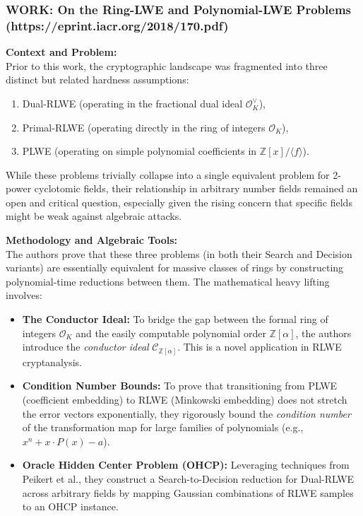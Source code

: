 \subsubsection{WORK: On the Ring-LWE and Polynomial-LWE Problems (https://eprint.iacr.org/2018/170.pdf)}

\textbf{Context and Problem:} \\
Prior to this work, the cryptographic landscape was fragmented into three distinct but related hardness assumptions: 
\begin{enumerate}
    \item Dual-RLWE (operating in the fractional dual ideal $\mathcal{O}_K^\vee$),
    \item Primal-RLWE (operating directly in the ring of integers $\mathcal{O}_K$),
    \item PLWE (operating on simple polynomial coefficients in $\mathbb{Z}[x]/\langle f\rangle$).
\end{enumerate}
While these problems trivially collapse into a single equivalent problem for 2-power cyclotomic fields, their relationship in arbitrary number fields remained an open and critical question, especially given the rising concern that specific fields might be weak against algebraic attacks.

\textbf{Methodology and Algebraic Tools:} \\
The authors prove that these three problems (in both their Search and Decision variants) are essentially equivalent for massive classes of rings by constructing polynomial-time reductions between them. The mathematical heavy lifting involves:
\begin{itemize}
    \item \textbf{The Conductor Ideal:} To bridge the gap between the formal ring of integers $\mathcal{O}_K$ and the easily computable polynomial order $\mathbb{Z}[\alpha]$, the authors introduce the \textit{conductor ideal} $\mathscr{C}_{\mathbb{Z}[\alpha]}$. This is a novel application in RLWE cryptanalysis.
    \item \textbf{Condition Number Bounds:} To prove that transitioning from PLWE (coefficient embedding) to RLWE (Minkowski embedding) does not stretch the error vectors exponentially, they rigorously bound the \textit{condition number} of the transformation map for large families of polynomials (e.g., $x^n + x \cdot P(x) - a$).
    \item \textbf{Oracle Hidden Center Problem (OHCP):} Leveraging techniques from Peikert et al., they construct a Search-to-Decision reduction for Dual-RLWE across arbitrary fields by mapping Gaussian combinations of RLWE samples to an OHCP instance.
\end{itemize}

